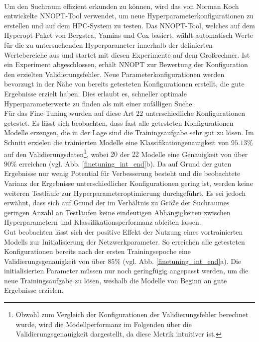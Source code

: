 \\
Um den Suchraum effizient erkunden zu können, wird das von Norman Koch entwickelte NNOPT-Tool verwendet, um neue Hyperparameterkonfigurationen zu erstellen und auf dem HPC-System zu testen. Das NNOPT-Tool, welches auf dem Hyperopt-Paket \cite{hyperopt} von Bergstra, Yamins und Cox basiert, wählt automatisch Werte für die zu untersuchenden Hyperparameter innerhalb der definierten Wertebereiche aus und startet mit diesen Experimente auf dem Großrechner. Ist ein Experiment abgeschlossen, erhält NNOPT zur Bewertung der Konfiguration den erzielten Validierungsfehler. Neue Parameterkonfigurationen werden bevorzugt in der Nähe von bereits getesteten Konfigurationen erstellt, die gute Ergebnisse erzielt haben. Dies erlaubt es, schneller optimale Hyperparameterwerte zu finden als mit einer zufälligen Suche.
\\
Für das Fine-Tuning wurden auf diese Art $22$ unterschiedliche Konfigurationen getestet. Es lässt sich beobachten, dass fast alle getesteten Konfigurationen Modelle erzeugen, die in der Lage sind die Trainingsaufgabe sehr gut zu lösen. Im Schnitt erzielen die trainierten Modelle eine Klassifikationgenauigkeit von $95.13\%$ auf den Validierungsdaten\footnote{Obwohl zum Vergleich der Konfigurationen der Validierungsfehler berechnet wurde, wird die Modellperformanz im Folgenden über die Validierungsgenauigkeit dargestellt, da diese Metrik intuitiver ist.}, wobei $20$ der $22$ Modelle eine Genauigkeit von über $90\%$ erreichen (vgl. Abb. \ref{finetuning_int_end}b). Da auf Grund der guten Ergebnisse nur wenig Potential für Verbesserung besteht und die beobachtete Varianz der Ergebnisse unterschiedlicher Konfigurationen gering ist, werden keine weiteren Testläufe zur Hyperparameteroptimierung durchgeführt. Es sei jedoch erwähnt, dass sich auf Grund der im Verhältnis zu Größe der Suchraumes geringen Anzahl an Testläufen keine eindeutigen Abhängigkeiten zwischen Hyperparametern und Klassifikationsperformanz ableiten lassen.
\\
Gut beobachten lässt sich der positive Effekt der Nutzung eines vortrainierten Modells zur Initialisierung der Netzwerkparameter. So erreichen alle getesteten Konfigurationen bereits nach der ersten Trainingsepoche eine Validierungsgenauigkeit von über $85\%$ (vgl. Abb. \ref{finetuning_int_end}a). Die initialisierten Parameter müssen nur noch geringfügig angepasst werden, um die neue Trainingsaufgabe zu lösen, weshalb die Modelle von Beginn an gute Ergebnisse erzielen. 
\\
